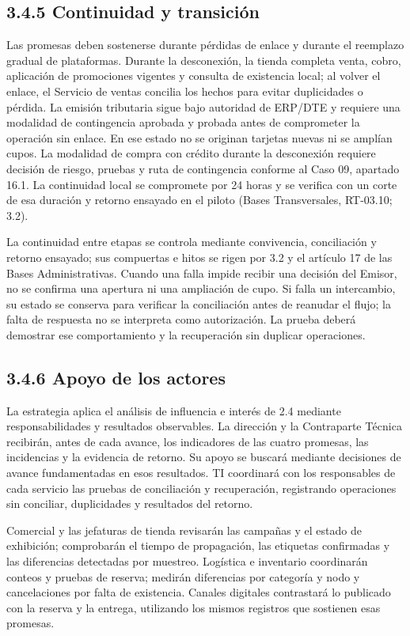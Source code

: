 \documentclass[11pt]{article}
\begin{document}
\subsection{3.4.5 Continuidad y transición}

{Las promesas deben sostenerse durante pérdidas de enlace y durante el reemplazo gradual de plataformas. Durante la desconexión, la tienda completa venta, cobro, aplicación de promociones vigentes y consulta de existencia local; al volver el enlace, el Servicio de ventas concilia los hechos para evitar duplicidades o pérdida. La emisión tributaria sigue bajo autoridad de ERP/DTE y requiere una modalidad de contingencia aprobada y probada antes de comprometer la operación sin enlace. En ese estado no se originan tarjetas nuevas ni se amplían cupos. La modalidad de compra con crédito durante la desconexión requiere decisión de riesgo, pruebas y ruta de contingencia conforme al Caso 09, apartado 16.1. La continuidad local se compromete por 24 horas y se verifica con un corte de esa duración y retorno ensayado en el piloto (Bases Transversales, RT-03.10; 3.2).}

{La continuidad entre etapas se controla mediante convivencia, conciliación y retorno ensayado; sus compuertas e hitos se rigen por 3.2 y el artículo 17 de las Bases Administrativas. Cuando una falla impide recibir una decisión del Emisor, no se confirma una apertura ni una ampliación de cupo. Si falla un intercambio, su estado se conserva para verificar la conciliación antes de reanudar el flujo; la falta de respuesta no se interpreta como autorización. La prueba deberá demostrar ese comportamiento y la recuperación sin duplicar operaciones.}

\subsection{3.4.6 Apoyo de los actores}

{La estrategia aplica el análisis de influencia e interés de 2.4 mediante responsabilidades y resultados observables. La dirección y la Contraparte Técnica recibirán, antes de cada avance, los indicadores de las cuatro promesas, las incidencias y la evidencia de retorno. Su apoyo se buscará mediante decisiones de avance fundamentadas en esos resultados. TI coordinará con los responsables de cada servicio las pruebas de conciliación y recuperación, registrando operaciones sin conciliar, duplicidades y resultados del retorno.}

{Comercial y las jefaturas de tienda revisarán las campañas y el estado de exhibición; comprobarán el tiempo de propagación, las etiquetas confirmadas y las diferencias detectadas por muestreo. Logística e inventario coordinarán conteos y pruebas de reserva; medirán diferencias por categoría y nodo y cancelaciones por falta de existencia. Canales digitales contrastará lo publicado con la reserva y la entrega, utilizando los mismos registros que sostienen esas promesas.}
\end{document}
